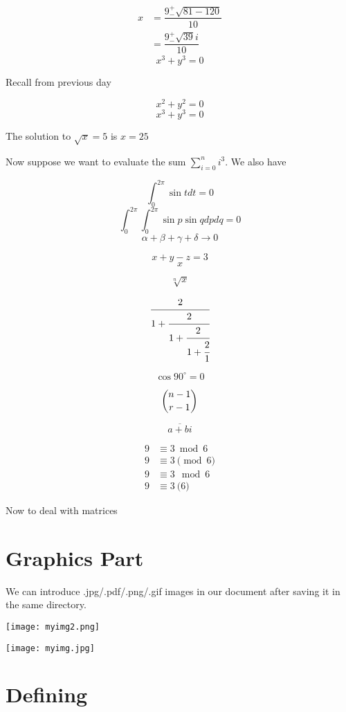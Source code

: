 \documentclass[12pt]{article}  %
\begin{document}
\begin{align*}
x &= \dfrac{9 ^{+}_{-} \sqrt{81 - 120}}{10}\\
  &= \dfrac{9 ^{+}_{-} \sqrt{39}i}{10}
\end{align*}
\[
x^3 + y^3 = 0
\]

Recall from previous day

\begin{equation}
x^2 + y^2 = 0 
\end{equation}
\begin{equation}
x^3 + y^3 = 0 
\end{equation}

The solution to $\sqrt{x} = 5$ is $x=25$

Now suppose we want to evaluate the sum
$\displaystyle\sum\limits_{i=0}^{n} i^3$.
We also have

$$\int_{0}^{2\pi} \sin{t}dt = 0$$
$$\int_{0}^{2\pi} \int_{0}^{2\pi}\sin{p} \sin{q}dp dq = 0$$
$$\alpha+\beta+\gamma+\delta \rightarrow 0$$

$$\mathit{x + y - z =3}$$
$$x$$


$$\sqrt[n]{x}$$

$$
\cfrac{2}{1+\cfrac{2}{1+\cfrac{2}{1+\cfrac{2}{1}}}} 
$$

$$\cos 90^\circ = 0$$


$$\dbinom{n-1}{r-1}$$

$$\overline{a+bi}$$

\begin{align*}
9 & \equiv3\bmod{6}\\	
9 & \equiv3\pmod{6}\\
9 & \equiv3\mod{6}\\
9 & \equiv3\pod{6}
\end{align*}

Now to deal with matrices

\section{Graphics Part}

We can introduce .jpg/.pdf/.png/.gif images in our document after saving it in the same directory.

\texttt{[image: myimg2.png]}


\begin{center}
\texttt{[image: myimg.jpg]}
\end{center}

\section{Defining}
\end{document}
